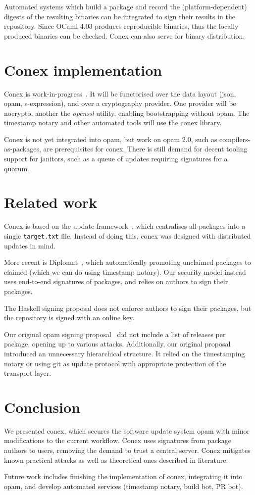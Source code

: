\documentclass[nocopyrightspace]{sigplanconf}
\newcommand{\TODO}[1]{\textbf{[TODO: #1]}}
\begin{document}
Automated systems which build a package and record the (platform-dependent) digests of the resulting binaries can be integrated to sign their results in the repository.
Since OCaml 4.03 produces reproducible binaries, thus the locally produced binaries can be checked.
Conex can also serve for binary distribution.

\section{Conex implementation} \label{sec:implementation}

Conex is work-in-progress~\cite{conex}.
It will be functorised over the data layout (json, opam, s-expression), and over a cryptography provider.
One provider will be nocrypto, another the \emph{openssl} utility, enabling bootstrapping without opam.
The timestamp notary and other automated tools will use the conex library.

Conex is not yet integrated into opam, but work on opam 2.0, such as compilers-as-packages, are prerequisites for conex.
There is still demand for decent tooling support for janitors, such as a queue of updates requiring signatures for a quorum.

\section{Related work} \label{sec:related}
Conex is based on the update framework~\cite{tuf}, which centralises all packages into a single \texttt{target.txt} file.
Instead of doing this, conex was designed with distributed updates in mind.

More recent is Diplomat~\cite{diplomat}, which automatically promoting unclaimed packages to claimed (which we can do using timestamp notary).
Our security model instead uses end-to-end signatures of packages, and relies on authors to sign their packages.

The Haskell signing proposal does not enforce authors to sign their packages, but the repository is signed with an online key.

Our original opam signing proposal~\cite{opamsigning} did not include a list of releases per package, opening up to various attacks.
Additionally, our original proposal introduced an unnecessary hierarchical structure.
It relied on the timestamping notary or using git as update protocol with appropriate protection of the transport layer.

\section{Conclusion} \label{sec:conclusion}
We presented conex, which secures the software update system opam with minor modifications to the current workflow.
Conex uses signatures from package authors to users, removing the demand to trust a central server.
Conex mitigates known practical attacks as well as theoretical ones described in literature.

Future work includes finishing the implementation of conex, integrating it into opam, and develop automated services (timestamp notary, build bot, PR bot).




\end{document}
